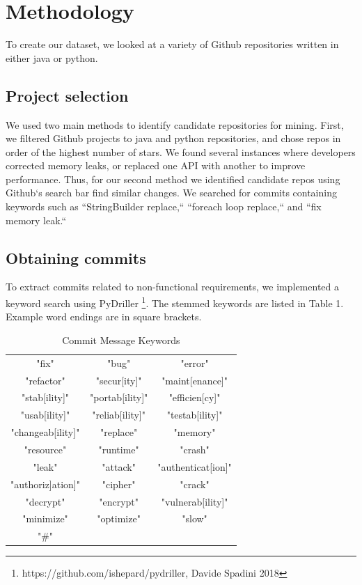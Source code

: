 \documentclass[sigconf]{acmart}
\begin{document}
\section{Methodology}


To create our dataset, we looked at a variety of Github repositories written in either java or python. 


\subsection {Project selection}
We used two main methods to identify candidate repositories for mining. 
First, we filtered Github projects to java and python repositories, and chose repos in order of the highest number of stars. We found several instances where developers corrected memory leaks, or replaced one API with another to improve performance. Thus, for our second method we identified candidate repos using Github`s search bar find similar changes. We searched for commits containing keywords such as ``StringBuilder replace,`` ``foreach loop replace,`` and ``fix memory leak.``


\subsection{Obtaining commits}
To extract commits related to non-functional requirements, we implemented a keyword search using PyDriller \footnote{https://github.com/ishepard/pydriller, Davide Spadini 2018}. The stemmed keywords are listed in Table 1. Example word endings are in square brackets.

\begin{table}

  \caption{Commit Message Keywords}
  \label{tab:kwds}
\begin{tabular}{  c c c }
\toprule
 "fix"&"bug"&"error"\\
 "refactor"&"secur[ity]" &"maint[enance]"\\
 "stab[ility]"&"portab[ility]"&"efficien[cy]"\\
 "usab[ility]" & "reliab[ility]"&"testab[ility]"\\
 "changeab[ility]"& "replace"&"memory"\\
 "resource"& "runtime"&"crash"\\
 "leak" &"attack" &"authenticat[ion]"\\
 "authoriz]ation]"& "cipher"&"crack" \\ 
 "decrypt"&"encrypt"&"vulnerab[ility]"\\ 
 "minimize"&"optimize"&"slow"\\
 "\#"& &\\
\bottomrule
\end{tabular}
\end{table}
\end{document}
